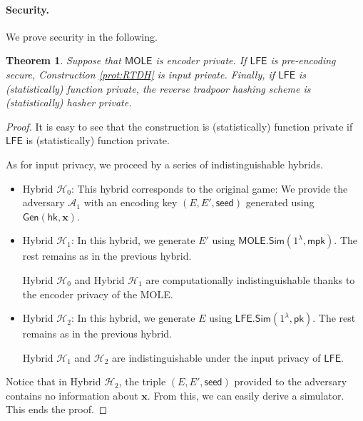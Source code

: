 \documentclass{article}
\newtheorem{theorem}{Theorem}\newtheorem{lemma}[theorem]{Lemma}\newtheorem{proposition}[theorem]{Proposition}\newtheorem{corollary}[theorem]{Corollary}\newtheorem{definition}[theorem]{Definition}\newtheorem{claim}[theorem]{Claim}
\newcommand{\LFE}{\mathsf{LFE}}
\newcommand{\MOLE}{\mathsf{MOLE}}
\renewcommand{\sec}{\ensuremath{\lambda}}
\newcommand{\Sim}{\mathsf{Sim}}
\newcommand{\Adv}{\mathcal{A}}
\newcommand{\algofont}[1]{\ensuremath{\mathsf{#1}}}
\newcommand{\Gen}{{\algofont{Gen}}}
\newcommand{\mpk}{\mathsf{mpk}}
\newcommand{\pk}{{\mathsf{pk}}}
\newcommand{\hk}{\ensuremath{\mathsf{hk}}}
\newcommand\bbbone{1}
\begin{document}
\paragraph{Security.} We prove security in the following.
\begin{theorem}
    Suppose that $\MOLE$ is encoder private. If $\LFE$ is pre-encoding secure, Construction \ref{prot:RTDH} is input private. 
    Finally, if $\LFE$ is (statistically) function private, the reverse tradpoor hashing scheme is (statistically) hasher private.
\end{theorem}
\begin{proof}
It is easy to see that the construction is (statistically) function private if $\LFE$ is (statistically) function private.

As for input privacy, we proceed by a series of indistinguishable hybrids.

\begin{itemize}
\item Hybrid $\mathcal{H}_0$: This hybrid corresponds to the original game: We provide the adversary $\Adv_1$ with an encoding key $(E, E', \mathsf{seed})$ generated using $\Gen(\hk, \mathbf{x})$. 

\item Hybrid ${\mathcal{H}_1}$: In this hybrid, we generate $E'$ using $\MOLE.\Sim(\bbbone^\sec, \mpk)$. The rest remains as in the previous hybrid.

Hybrid ${\mathcal{H}_0}$ and Hybrid ${\mathcal{H}_1}$ are computationally indistinguishable thanks to the encoder privacy of the MOLE.

\item Hybrid ${\mathcal{H}_2}$: In this hybrid, we generate $E$ using $\LFE.\Sim(\bbbone^\sec, \pk)$. 
The rest remains as in the previous hybrid.

Hybrid ${\mathcal{H}_1}$ and ${\mathcal{H}_2}$ are indistinguishable under the input privacy of $\LFE$.
\end{itemize}
Notice that in Hybrid ${\mathcal{H}_2}$, the triple $(E, E', \mathsf{seed})$ provided to the adversary contains no information about $\mathbf{x}$. From this, we can easily derive a simulator. This ends the proof.
\end{proof}
\end{document}
